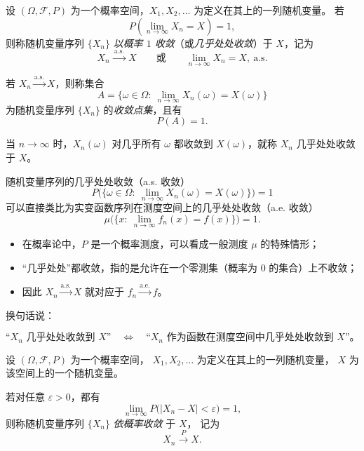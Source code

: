 \begin{definition}[随机变量序列的几乎处处收敛]
设 $(\Omega,\mathcal{F},P)$ 为一个概率空间，$X_1,X_2,\dots$ 为定义在其上的一列随机变量。
若
\[
P\!\left( \lim_{n\to\infty} X_n = X \right)=1,
\]
则称随机变量序列 $\{X_n\}$ \emph{以概率 $1$ 收敛}（或\emph{几乎处处收敛}）于 $X$，记为
\[
X_n \xrightarrow{\ \text{a.s.}\ } X
\qquad\text{或}\qquad 
\lim_{n\to\infty} X_n = X,\ \text{a.s.}
\]

若 $X_n \xrightarrow{\text{a.s.}} X$，则称集合
\[
A=\{\omega\in\Omega:\ \lim_{n\to\infty} X_n(\omega)=X(\omega)\}
\]
为随机变量序列 $\{X_n\}$ 的\emph{收敛点集}，且有
\[
P(A)=1.
\]
\end{definition}
\begin{note}
    当 $n\to\infty$ 时，$X_n(\omega)$ 对几乎所有 $\omega$ 都收敛到 $X(\omega)$，就称 $X_n$ 几乎处处收敛于 $X$。
\end{note}
\begin{note}[几乎处处收敛与实变函数收敛的类比]

随机变量序列的几乎处处收敛（a.s. 收敛）
\[
P\bigl(\{\omega\in\Omega:\ \lim_{n\to\infty}X_n(\omega)=X(\omega)\}\bigr)=1
\]
可以直接类比为实变函数序列在测度空间上的几乎处处收敛（a.e. 收敛）
\[
\mu\bigl(\{x:\ \lim_{n\to\infty}f_n(x)=f(x)\}\bigr)=1.
\]

\begin{itemize}
  \item 在概率论中，$P$ 是一个概率测度，可以看成一般测度 $\mu$ 的特殊情形；
  \item “几乎处处”都收敛，指的是允许在一个零测集（概率为 $0$ 的集合）上不收敛；
  \item 因此 $X_n \xrightarrow{\text{a.s.}} X$ 就对应于
        $f_n \xrightarrow{\text{a.e.}} f$。
\end{itemize}

换句话说：

\[
\text{“$X_n$ 几乎处处收敛到 $X$”} 
\quad\Longleftrightarrow\quad
\text{“$X_n$ 作为函数在测度空间中几乎处处收敛到 $X$”。}
\]

\end{note}
\begin{definition}[随机变量序列的依概率收敛]
设 $(\Omega,\mathcal{F},P)$ 为一个概率空间，
$X_1,X_2,\dots$ 为定义在其上的一列随机变量，
$X$ 为该空间上的一个随机变量。

若对任意 $\varepsilon>0$，都有
\[
\lim_{n\to\infty} P\bigl(|X_n - X| < \varepsilon \bigr) = 1,
\]
则称随机变量序列 $\{X_n\}$ \emph{依概率收敛} 于 $X$，
记为
\[
X_n \xrightarrow{\ P\ } X.
\]
\end{definition}
